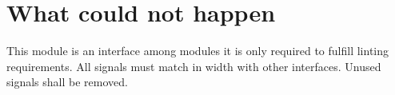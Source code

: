 \section{What could not happen}

This module is an interface among modules it is only required to fulfill linting requirements. All signals must match in width with other interfaces. Unused signals shall be removed. 